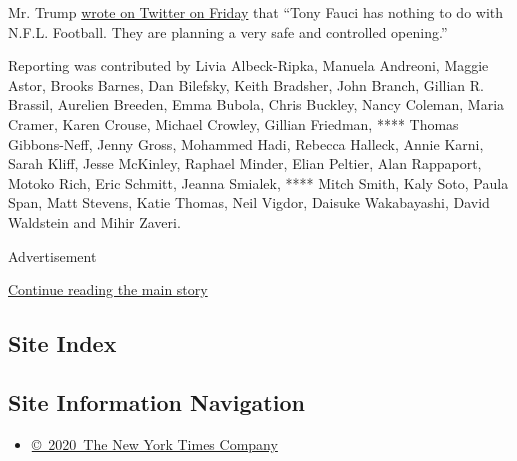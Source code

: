 Mr. Trump
\href{https://twitter.com/realDonaldTrump/status/1274006223013249026}{wrote
on Twitter on Friday} that ``Tony Fauci has nothing to do with N.F.L.
Football. They are planning a very safe and controlled opening.''

Reporting was contributed by Livia Albeck-Ripka, Manuela Andreoni,
Maggie Astor, Brooks Barnes, Dan Bilefsky, Keith Bradsher, John Branch,
Gillian R. Brassil, Aurelien Breeden, Emma Bubola, Chris Buckley, Nancy
Coleman, Maria Cramer, Karen Crouse, Michael Crowley, Gillian Friedman,
**** Thomas Gibbons-Neff, Jenny Gross, Mohammed Hadi, Rebecca Halleck,
Annie Karni, Sarah Kliff, Jesse McKinley, Raphael Minder, Elian Peltier,
Alan Rappaport, Motoko Rich, Eric Schmitt, Jeanna Smialek, **** Mitch
Smith, Kaly Soto, Paula Span, Matt Stevens, Katie Thomas, Neil Vigdor,
Daisuke Wakabayashi, David Waldstein and Mihir Zaveri.

Advertisement

\protect\hyperlink{after-bottom}{Continue reading the main story}

\hypertarget{site-index}{%
\subsection{Site Index}\label{site-index}}

\hypertarget{site-information-navigation}{%
\subsection{Site Information
Navigation}\label{site-information-navigation}}

\begin{itemize}
\tightlist
\item
  \href{https://help.nytimes.com/hc/en-us/articles/115014792127-Copyright-notice}{©~2020~The
  New York Times Company}
\end{itemize}

